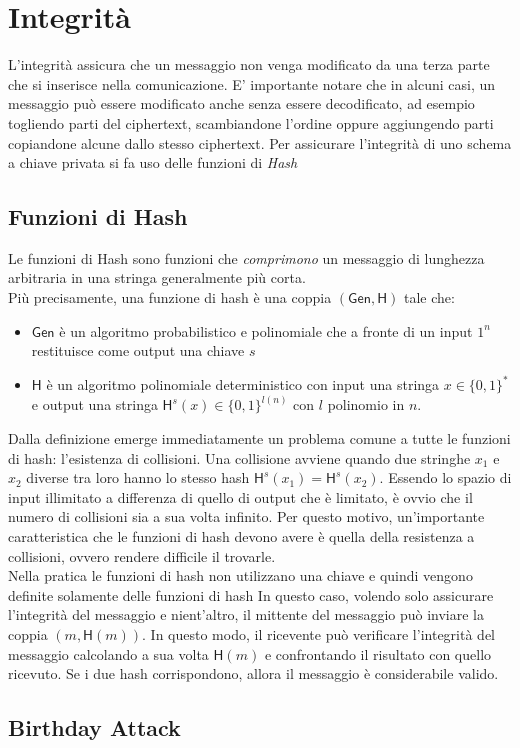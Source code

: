 \section{Integrità}
L'integrità assicura che un messaggio non venga modificato da una terza parte che si inserisce nella comunicazione. E' importante notare che in alcuni casi, un messaggio può essere modificato anche senza essere decodificato, ad esempio togliendo parti del ciphertext, scambiandone l'ordine oppure aggiungendo parti copiandone alcune dallo stesso ciphertext.
Per assicurare l'integrità di uno schema a chiave privata si fa uso delle funzioni di \emph{Hash}
\subsection{Funzioni di Hash}
Le funzioni di Hash sono funzioni che \emph{comprimono} un messaggio di lunghezza arbitraria in una stringa generalmente più corta.\\
Più precisamente, una funzione di hash è una coppia $(\mathsf{Gen}, \mathsf{H})$ tale che:
\begin{itemize}
    \item{$\mathsf{Gen}$ è un algoritmo probabilistico e polinomiale che a fronte di un input $1^n$ restituisce come output una chiave $s$}
    \item{$\mathsf{H}$ è un algoritmo polinomiale deterministico con input una stringa $x \in \{0, 1\}^{*}$  e output una stringa $\mathsf{H}^{s}(x) \in \{0, 1\}^{l(n)}$ con $l$ polinomio in $n$.}
\end{itemize}
Dalla definizione emerge immediatamente un problema comune a tutte le funzioni di hash: l'esistenza di collisioni. Una collisione avviene quando due stringhe $x_1$ e $x_2$ diverse tra loro hanno lo stesso hash $\mathsf{H}^{s}(x_1) = \mathsf{H}^{s}(x_2)$. Essendo lo spazio di input illimitato a differenza di quello di output che è limitato, è ovvio che il numero di collisioni sia a sua volta infinito. Per questo motivo, un'importante caratteristica che le funzioni di hash devono avere è quella della resistenza a collisioni, ovvero rendere difficile il trovarle.\\
Nella pratica le funzioni di hash non utilizzano una chiave e quindi vengono definite solamente delle funzioni di hash
In questo caso, volendo solo assicurare l'integrità del messaggio e nient'altro, il mittente del messaggio può inviare la coppia $(m, \mathsf{H}(m))$. In questo modo, il ricevente può verificare l'integrità del messaggio calcolando a sua volta $\mathsf{H}(m)$ e confrontando il risultato con quello ricevuto. Se i due hash corrispondono, allora il messaggio è considerabile valido.\\
\subsection{Birthday Attack}

